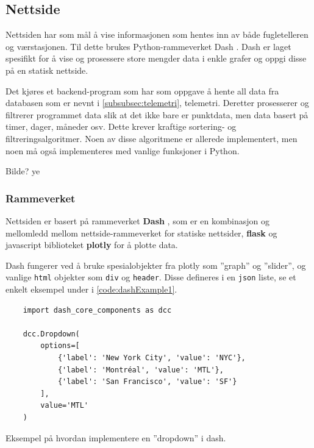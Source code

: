 

\subsection{Nettside}

Nettsiden har som mål å vise informasjonen som hentes inn av både fugletelleren og værstasjonen. Til dette brukes Python-rammeverket Dash \cite{dash}. Dash er laget spesifikt for å vise og prosessere store mengder data i enkle grafer og oppgi disse på en statisk nettside. 

Det kjøres et backend-program som har som oppgave å hente all data fra databasen som er nevnt i \autoref{subsubsec:telemetri}, telemetri. Deretter prosesserer og filtrerer programmet data slik at det ikke bare er punktdata, men data basert på timer, dager, måneder osv. Dette krever kraftige sortering- og filtreringsalgoritmer. Noen av disse algoritmene er allerede implementert, men noen må også implementeres med vanlige funksjoner i Python. 

Bilde? ye

\subsubsection{Rammeverket}

Nettsiden er basert på rammeverket \textbf{Dash} \cite{dash}, som er en kombinasjon og mellomledd mellom nettside-rammeverket for statiske nettsider, \textbf{flask} \cite{flask} og javascript biblioteket \textbf{plotly} \cite{plotly} for å plotte data.

Dash fungerer ved å bruke spesialobjekter fra plotly som ''graph'' og ''slider'', og vanlige \texttt{html} objekter som \texttt{div} og \texttt{header}. Disse defineres i en \texttt{json} liste, se et enkelt eksempel under i \autoref{code:dashExample1}. 

\begin{code}
\begin{verbatim}
    import dash_core_components as dcc

    dcc.Dropdown(
        options=[
            {'label': 'New York City', 'value': 'NYC'},
            {'label': 'Montréal', 'value': 'MTL'},
            {'label': 'San Francisco', 'value': 'SF'}
        ],
        value='MTL'
    )
\end{verbatim}
\caption{Eksempel på hvordan implementere en ''dropdown'' i dash.}
\label{code:dashExample1}
\end{code}

